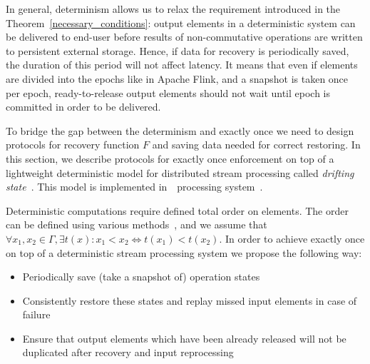 
\label {fs-consistency-section}

In general, determinism allows us to relax the requirement introduced in the Theorem~\ref{necessary_conditions}: output elements in a deterministic system can be delivered to end-user before results of non-commutative operations are written to persistent external storage. Hence, if data for recovery is periodically saved, the duration of this period will not affect latency. It means that even if elements are divided into the epochs like in Apache Flink, and a snapshot is taken once per epoch, ready-to-release output elements should not wait until epoch is committed in order to be delivered. 

To bridge the gap between the determinism and exactly once we need to design protocols for recovery function $F$ and saving data needed for correct restoring. In this section, we describe protocols for exactly once enforcement on top of a lightweight deterministic model for distributed stream processing called {\em drifting state}~\cite{we2018adbis}. This model is implemented in~\FlameStream\ processing system~\cite{we2018beyondmr}.

Deterministic computations require defined total order on elements. The order can be defined using various methods~\cite{we2018seim}, and we assume that $\forall x_1,x_2\in \Gamma, \exists t(x): x_1 < x_2 \Longleftrightarrow t(x_1) < t(x_2)$. In order to achieve exactly once on top of a deterministic stream processing system we propose the following way:
\begin{itemize}
    \item Periodically save (take a snapshot of) operation states
    \item Consistently restore these states and replay missed input elements in case of failure
    \item Ensure that output elements which have been already released will not be duplicated after recovery and input reprocessing
\end{itemize}

